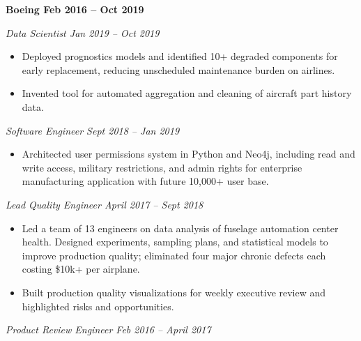 \documentclass[10pt,letterpaper]{article}
\begin{document}
    \textbf{Boeing \hfill Feb 2016 – Oct 2019}

        \quad \emph{Data Scientist \hfill Jan 2019 – Oct 2019}

            \begin{itemize}[label={--}, leftmargin=.5in, labelindent=16pt, topsep=1pt]
                \setlength\itemsep{-.25em}
            	\item Deployed prognostics models and identified 10+ degraded components for early replacement, reducing unscheduled maintenance burden on airlines.
            	\item Invented tool for automated aggregation and cleaning of aircraft part history data.
            \end{itemize}

        \quad \emph{Software Engineer \hfill Sept 2018 – Jan 2019}

            \begin{itemize}[label={--}, leftmargin=.5in, labelindent=16pt, topsep=1pt]
                \setlength\itemsep{-.25em}
            	\item Architected user permissions system in Python and Neo4j, including read and write access, military restrictions, and admin rights for enterprise manufacturing application with future 10,000+ user base.
            \end{itemize}

        \quad \emph{Lead Quality Engineer \hfill April 2017 – Sept 2018}

            \begin{itemize}[label={--}, leftmargin=.5in, labelindent=16pt, topsep=1pt]
                \setlength\itemsep{-.25em}
            	\item Led a team of 13 engineers on data analysis of fuselage automation center health. Designed experiments, sampling plans, and statistical models to improve production quality; eliminated four major chronic defects each costing \$10k+ per airplane.
            	\item Built production quality visualizations for weekly executive review and highlighted risks and opportunities.
            \end{itemize}

        \quad \emph{Product Review Engineer \hfill Feb 2016 – April 2017}
\end{document}
